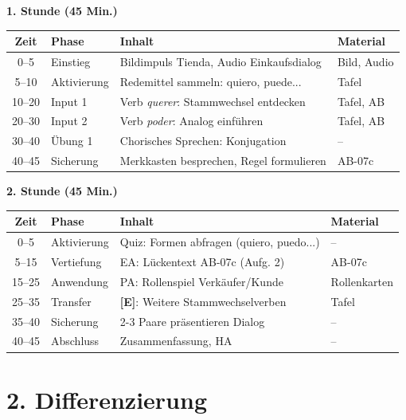 \documentclass[11pt, a4paper]{article}
\newcommand{\E}{\textcolor{erweiterung}{\textbf{[E]}}}
\begin{document}
\textbf{1. Stunde (45 Min.)}

\begin{tabularx}{\textwidth}{|c|l|X|l|}
\hline
\textbf{Zeit} & \textbf{Phase} & \textbf{Inhalt} & \textbf{Material} \\
\hline
0--5 & Einstieg & Bildimpuls Tienda, Audio Einkaufsdialog & Bild, Audio \\
\hline
5--10 & Aktivierung & Redemittel sammeln: quiero, puede... & Tafel \\
\hline
10--20 & Input 1 & Verb \textit{querer}: Stammwechsel entdecken & Tafel, AB \\
\hline
20--30 & Input 2 & Verb \textit{poder}: Analog einführen & Tafel, AB \\
\hline
30--40 & Übung 1 & Chorisches Sprechen: Konjugation & -- \\
\hline
40--45 & Sicherung & Merkkasten besprechen, Regel formulieren & AB-07c \\
\hline
\end{tabularx}

\vspace{1em}

\textbf{2. Stunde (45 Min.)}

\begin{tabularx}{\textwidth}{|c|l|X|l|}
\hline
\textbf{Zeit} & \textbf{Phase} & \textbf{Inhalt} & \textbf{Material} \\
\hline
0--5 & Aktivierung & Quiz: Formen abfragen (quiero, puedo...) & -- \\
\hline
5--15 & Vertiefung & EA: Lückentext AB-07c (Aufg. 2) & AB-07c \\
\hline
15--25 & Anwendung & PA: Rollenspiel Verkäufer/Kunde & Rollenkarten \\
\hline
25--35 & Transfer & \E{}: Weitere Stammwechselverben & Tafel \\
\hline
35--40 & Sicherung & 2-3 Paare präsentieren Dialog & -- \\
\hline
40--45 & Abschluss & Zusammenfassung, HA & -- \\
\hline
\end{tabularx}


\section*{2. Differenzierung}
\end{document}
